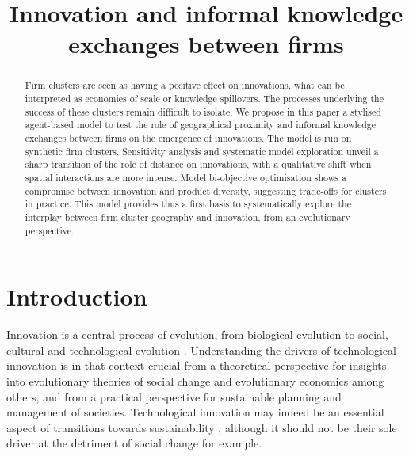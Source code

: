 \documentclass[letterpaper]{article}
\title{Innovation and informal knowledge exchanges between firms}
\begin{document}
\maketitle

\begin{abstract}
Firm clusters are seen as having a positive effect on innovations, what can be interpreted as economies of scale or knowledge spillovers. The processes underlying the success of these clusters remain difficult to isolate. We propose in this paper a stylised agent-based model to test the role of geographical proximity and informal knowledge exchanges between firms on the emergence of innovations. The model is run on synthetic firm clusters. Sensitivity analysis and systematic model exploration unveil a sharp transition of the role of distance on innovations, with a qualitative shift when spatial interactions are more intense. Model bi-objective optimisation shows a compromise between innovation and product diversity, suggesting trade-offs for clusters in practice. This model provides thus a first basis to systematically explore the interplay between firm cluster geography and innovation, from an evolutionary perspective.
\end{abstract}


\section{Introduction}

Innovation is a central process of evolution, from biological evolution to social, cultural \citep{mesoudi2018cumulative} and technological evolution \citep{sood2005technological}. Understanding the drivers of technological innovation is in that context crucial from a theoretical perspective for insights into evolutionary theories of social change and evolutionary economics among others, and from a practical perspective for sustainable planning and management of societies. Technological innovation may indeed be an essential aspect of transitions towards sustainability \citep{adams2016sustainability}, although it should not be their sole driver at the detriment of social change for example.
\end{document}
